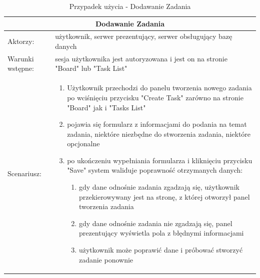 \begin{table}[h!]
	\begin{tabular}{ |p{2cm}||p{13cm}|  }
		
		\hline
		\multicolumn{2}{|c|}{Dodawanie Zadania} \\
		\hline
		Aktorzy: &użytkownik, serwer prezentujący, serwer obsługujący bazę danych\\
		\hline
		Warunki wstępne: &sesja użytkownika jest autoryzowana i jest on na stronie "Board" lub "Task List"\\
		\hline
		Scenariusz: &
		
		\begin{enumerate}
			\item Użytkownik przechodzi do panelu tworzenia nowego zadania po wciśnięciu przycisku "Create Task" zarówno na stronie "Board" jak i "Tasks List"
			\item pojawia się formularz z informacjami do podania na temat zadania, niektóre niezbędne do stworzenia zadania, niektóre opcjonalne
			\item po ukończeniu wypełniania formularza i kliknięciu przycisku "Save" system waliduje poprawność otrzymanych danych:
			\begin{enumerate}
				\item gdy dane odnośnie zadania zgadzają się, użytkownik przekierowywany jest na stronę, z której otworzył panel tworzenia zadania
				\item gdy dane odnośnie zadania nie zgadzają się, panel prezentujący wyświetla pola z błędnymi informacjami
				\item użytkownik może poprawić dane i próbować stworzyć zadanie ponownie
			\end{enumerate}
		\end{enumerate}\\
		\hline
	\end{tabular}
	\caption{Przypadek użycia - Dodawanie Zadania}
\end{table}



